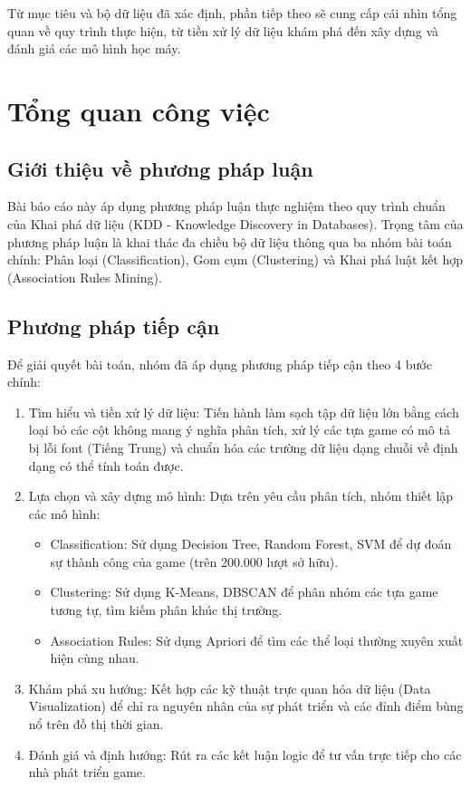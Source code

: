 \hspace{1cm} Từ mục tiêu và bộ dữ liệu đã xác định, phần tiếp theo sẽ cung cấp cái nhìn tổng quan về quy trình thực hiện, từ tiền xử lý dữ liệu khám phá đến xây dựng và đánh giá các mô hình học máy.






\newpage
\section{Tổng quan công việc}

\subsection{Giới thiệu về phương pháp luận}
\hspace{1cm} Bài báo cáo này áp dụng phương pháp luận thực nghiệm theo quy trình chuẩn của Khai phá dữ liệu (KDD - Knowledge Discovery in Databases). Trọng tâm của phương pháp luận là khai thác đa chiều bộ dữ liệu thông qua ba nhóm bài toán chính: Phân loại (Classification), Gom cụm (Clustering) và Khai phá luật kết hợp (Association Rules Mining).

\subsection{Phương pháp tiếp cận}
\hspace{1cm} Để giải quyết bài toán, nhóm đã áp dụng phương pháp tiếp cận theo 4 bước chính:
\begin{enumerate}
    \item Tìm hiểu và tiền xử lý dữ liệu: Tiến hành làm sạch tập dữ liệu lớn bằng cách loại bỏ các cột không mang ý nghĩa phân tích, xử lý các tựa game có mô tả bị lỗi font (Tiếng Trung) và chuẩn hóa các trường dữ liệu dạng chuỗi về định dạng có thể tính toán được.
    \item Lựa chọn và xây dựng mô hình: Dựa trên yêu cầu phân tích, nhóm thiết lập các mô hình:
    \begin{itemize}
        \item Classification: Sử dụng Decision Tree, Random Forest, SVM để dự đoán sự thành công của game (trên 200.000 lượt sở hữu).
        \item Clustering: Sử dụng K-Means, DBSCAN để phân nhóm các tựa game tương tự, tìm kiếm phân khúc thị trường.
        \item Association Rules: Sử dụng Apriori để tìm các thể loại thường xuyên xuất hiện cùng nhau.
    \end{itemize}
    \item Khám phá xu hướng: Kết hợp các kỹ thuật trực quan hóa dữ liệu (Data Visualization) để chỉ ra nguyên nhân của sự phát triển và các đỉnh điểm bùng nổ trên đồ thị thời gian.
    \item Đánh giá và định hướng: Rút ra các kết luận logic để tư vấn trực tiếp cho các nhà phát triển game.
\end{enumerate}

